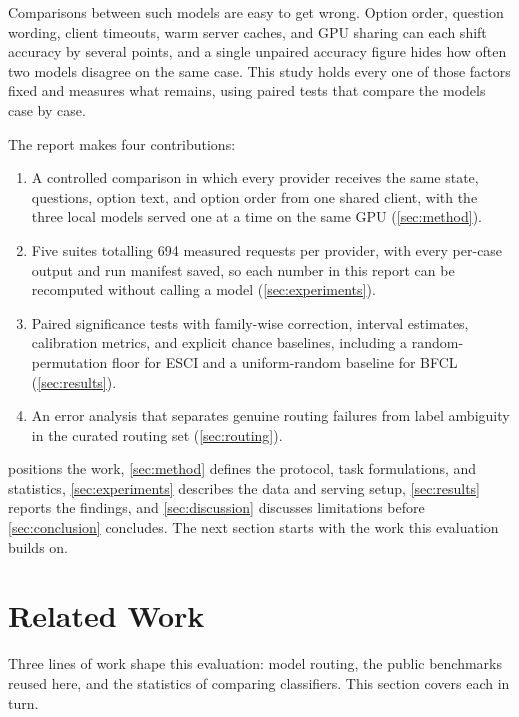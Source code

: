 \documentclass[11pt,a4paper]{article}
\begin{document}
Comparisons between such models are easy to get wrong. Option order, question wording, client
timeouts, warm server caches, and GPU sharing can each shift accuracy by several points, and a single
unpaired accuracy figure hides how often two models disagree on the same case. This study holds every
one of those factors fixed and measures what remains, using paired tests that compare the models case
by case.

The report makes four contributions:
\begin{enumerate}
  \item A controlled comparison in which every provider receives the same state, questions, option
        text, and option order from one shared client, with the three local models served one at a
        time on the same GPU (\cref{sec:method}).
  \item Five suites totalling 694 measured requests per provider, with every per-case output and
        run manifest saved, so each number in this report can be recomputed without calling a model
        (\cref{sec:experiments}).
  \item Paired significance tests with family-wise correction, interval estimates, calibration
        metrics, and explicit chance baselines, including a random-permutation floor for ESCI and a
        uniform-random baseline for BFCL (\cref{sec:results}).
  \item An error analysis that separates genuine routing failures from label ambiguity in the curated
        routing set (\cref{sec:routing}).
\end{enumerate}

 positions the work, \cref{sec:method} defines the protocol, task formulations,
and statistics, \cref{sec:experiments} describes the data and serving setup, \cref{sec:results}
reports the findings, and \cref{sec:discussion} discusses limitations before \cref{sec:conclusion}
concludes. The next section starts with the work this evaluation builds on.

\section{Related Work}\label{sec:related}

Three lines of work shape this evaluation: model routing, the public benchmarks reused here, and the
statistics of comparing classifiers. This section covers each in turn.
\end{document}
